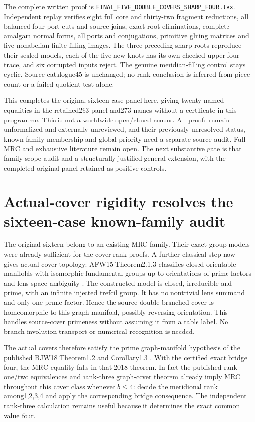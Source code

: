 \documentclass[11pt]{article}
\begin{document}
The complete written proof is
\texttt{FINAL\_FIVE\_DOUBLE\_COVERS\_SHARP\_FOUR.tex}.
Independent replay verifies eight full core and thirty-two fragment
reductions, all balanced four-port cuts and source joins, exact root
eliminations, complete amalgam normal forms, all ports and conjugations,
primitive gluing matrices and five nonabelian finite filling images.
The three preceding sharp roots reproduce their sealed models, each
of the five new knots has its own checked upper-four trace, and six
corrupted inputs reject. The genuine meridian-filling control stays
cyclic. Source catalogue45 is unchanged; no rank conclusion is inferred
from piece count or a failed quotient test alone.

This completes the original sixteen-case panel here, giving twenty
named equalities in the retained293 panel and273 names without a
certificate in this programme. This is not a worldwide open/closed
census. All proofs remain unformalized and externally unreviewed, and
their previously-unresolved status, known-family membership and global
priority need a separate source audit. Full MRC and exhaustive literature
remain open. The next substantive gate is that family-scope audit and
a structurally justified general extension, with the completed original
panel retained as positive controls.

\section{Actual-cover rigidity resolves the sixteen-case known-family audit}

The original sixteen belong to an existing MRC family. Their exact group
models were already sufficient for the cover-rank proofs. A further
classical step now gives actual-cover topology: AFW15
Theorem2.1.3 classifies closed orientable manifolds with isomorphic
fundamental groups up to orientations of prime factors and lens-space
ambiguity \cite{afw}. The constructed model is closed, irreducible and
prime, with an infinite injected trefoil group. It has no nontrivial lens
summand and only one prime factor. Hence the source double branched cover
is homeomorphic to this graph manifold, possibly reversing orientation.
This handles source-cover primeness without assuming it from a table
label. No branch-involution transport or numerical recognition is needed.

The actual covers therefore satisfy the prime graph-manifold hypothesis
of the published BJW18 Theorem1.2 and Corollary1.3 \cite{bjw}.
With the certified exact bridge four, the MRC equality falls in that
2018 theorem. In fact the published rank-one/two equivalences and rank-three
graph-cover theorem already imply MRC throughout this cover class whenever
$b\le4$: decide the meridional rank among1,2,3,4 and apply the corresponding
bridge consequence. The independent rank-three calculation remains useful
because it determines the exact common value four.
\end{document}
